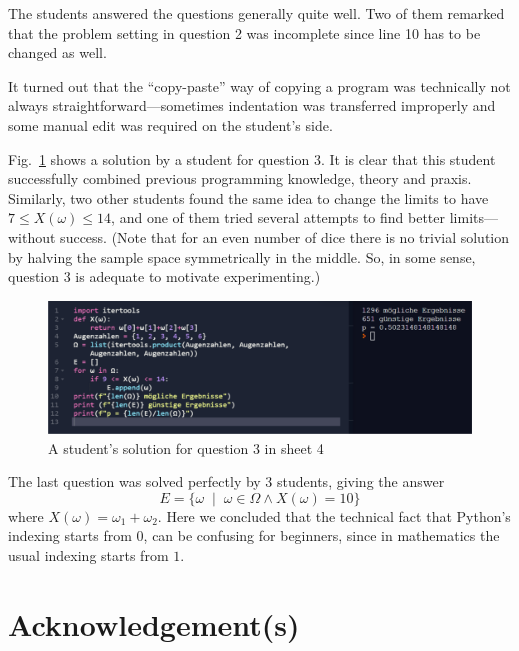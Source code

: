 \documentclass[]{interact}
\theoremstyle{plain}%
\theoremstyle{definition}
\theoremstyle{remark}
\begin{document}
The students answered the questions generally quite well. Two of them remarked that
the problem setting in question 2 was incomplete since line 10 has to be changed as well.

It turned out that the ``copy-paste'' way of copying a program was technically not always
straightforward---sometimes indentation was transferred improperly and some manual edit
was required on the student's side.

Fig.~\ref{42} shows a solution by a student for question 3. It is clear that this
student successfully combined previous programming knowledge, theory and praxis. Similarly,
two other students found the same idea to change the limits to have $7\leq X(\omega)\leq14$,
and one of them tried several attempts to find better limits---without success.
(Note that for an even number of dice there is no trivial solution by halving the
sample space symmetrically in the middle. So, in some sense, question 3 is adequate to motivate
experimenting.)

\begin{figure}
\begin{center}\includegraphics[width=1.0\textwidth]{42}
\caption{A student's solution for question 3 in sheet 4}
\label{42}
\end{center}
\end{figure}

The last question was solved perfectly by 3 students, giving the answer
$$E=\{\omega\;\mid\;\omega\in\Omega \land X(\omega)=10\}$$
where $X(\omega)=\omega_1+\omega_2$. Here we concluded that the technical
fact that Python's indexing starts from $0$, can be confusing for beginners,
since in mathematics the usual indexing starts from $1$.

\section*{Acknowledgement(s)}

\begin{thebibliography}{99}


\end{thebibliography}
\end{document}

